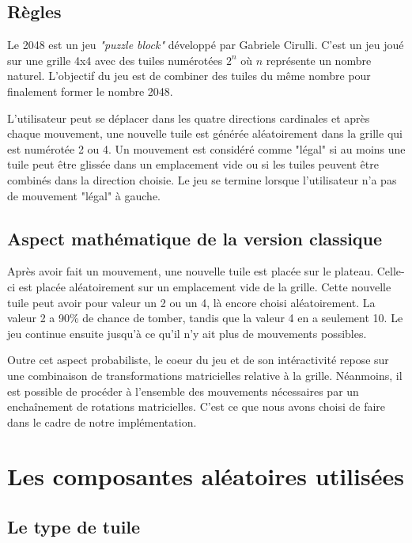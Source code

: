 \documentclass[a4paper, 12pt]{report}
\begin{document}
\section{Règles}

\tabto{1cm}Le 2048 est un jeu \textit{"puzzle block"} développé par Gabriele Cirulli. C'est un jeu joué sur
une grille 4x4 avec des tuiles numérotées ${2^{n}}$ où ${n}$ représente un nombre naturel. L'objectif
du jeu est de combiner des tuiles du même nombre pour finalement former le nombre 2048.

\vspace{0.5cm}

\tabto{1cm}L'utilisateur peut se déplacer dans les quatre directions cardinales et après chaque mouvement,
une nouvelle tuile est générée aléatoirement dans la grille qui est numérotée 2 ou 4. Un mouvement est
considéré comme "légal" si au moins une tuile peut être glissée dans un emplacement vide ou si les tuiles
peuvent être combinés dans la direction choisie. Le jeu se termine lorsque l'utilisateur n'a pas de mouvement
"légal" à gauche.

\section{Aspect mathématique de la version classique}

\tabto{1cm}Après avoir fait un mouvement, une nouvelle tuile est placée sur le plateau.
Celle-ci est placée aléatoirement sur un emplacement vide de la grille. Cette nouvelle tuile
peut avoir pour valeur un 2 ou un 4, là encore choisi aléatoirement. La valeur 2 a 90\% de chance
de tomber, tandis que la valeur 4 en a seulement 10. Le jeu continue ensuite jusqu'à ce qu'il n'y
ait plus de mouvements possibles.

\vspace{0.5cm}

\tabto{1cm}Outre cet aspect probabiliste, le coeur du jeu et de son intéractivité repose sur une
combinaison de transformations matricielles relative à la grille. Néanmoins, il est possible de
procéder à l'ensemble des mouvements nécessaires par un enchaînement de rotations matricielles.
C'est ce que nous avons choisi de faire dans le cadre de notre implémentation.

\chapter{Les composantes aléatoires utilisées}

\section{Le type de tuile}
\end{document}
